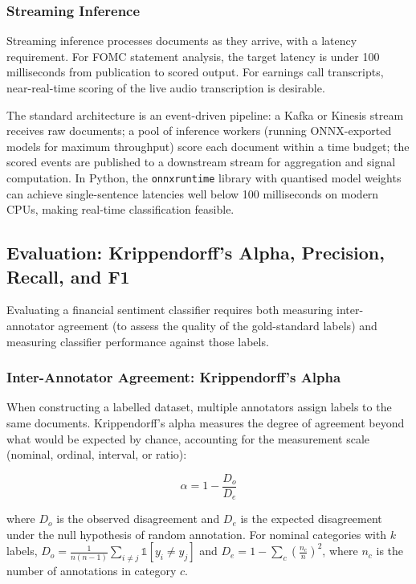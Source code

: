 \subsubsection*{Streaming Inference}

Streaming inference processes documents as they arrive, with a latency requirement. For FOMC statement analysis, the target latency is under 100 milliseconds from publication to scored output. For earnings call transcripts, near-real-time scoring of the live audio transcription is desirable.

The standard architecture is an event-driven pipeline: a Kafka or Kinesis stream receives raw documents; a pool of inference workers (running ONNX-exported models for maximum throughput) score each document within a time budget; the scored events are published to a downstream stream for aggregation and signal computation. In Python, the \texttt{onnxruntime} library with quantised model weights can achieve single-sentence latencies well below 100 milliseconds on modern CPUs, making real-time classification feasible.

\subsection{Evaluation: Krippendorff's Alpha, Precision, Recall, and F1}
\label{sec:ch09-evaluation}

Evaluating a financial sentiment classifier requires both measuring inter-annotator agreement (to assess the quality of the gold-standard labels) and measuring classifier performance against those labels.

\subsubsection*{Inter-Annotator Agreement: Krippendorff's Alpha}

When constructing a labelled dataset, multiple annotators assign labels to the same documents. Krippendorff's alpha \cite{krippendorff1970estimating} measures the degree of agreement beyond what would be expected by chance, accounting for the measurement scale (nominal, ordinal, interval, or ratio):

\begin{equation}
  \label{eq:krippendorff-alpha}
  \alpha = 1 - \frac{D_o}{D_e}
\end{equation}

where $D_o$ is the observed disagreement and $D_e$ is the expected disagreement under the null hypothesis of random annotation. For nominal categories with $k$ labels, $D_o = \frac{1}{n(n-1)} \sum_{i \neq j} \mathbb{1}[y_i \neq y_j]$ and $D_e = 1 - \sum_c \left(\frac{n_c}{n}\right)^2$, where $n_c$ is the number of annotations in category $c$.

